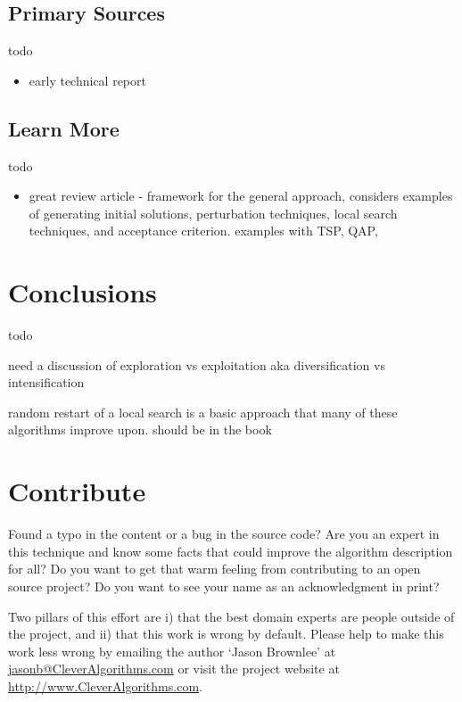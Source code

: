 \documentclass[a4paper, 11pt]{article}
\makeatletter
\newcommand{\myreportauthor}{Jason Brownlee}
\newcommand{\myreportemail}{jasonb@CleverAlgorithms.com}
\newcommand{\myreportwebsite}{http://www.CleverAlgorithms.com}
\makeatother
\begin{document}
\subsection{Primary Sources}
todo

\begin{itemize}
	\item early technical report \cite{Stuetzle1999}
\end{itemize}

% 
% 
\subsection{Learn More}
todo

\begin{itemize}
	\item great review article \cite{Ramalhinho-Lourenco2003} - framework for the general approach, considers examples of generating initial solutions, perturbation techniques, local search techniques, and acceptance criterion. examples with TSP, QAP, 
\end{itemize}

% 
% 
\section{Conclusions}
\label{sec:conclusions}
todo

need a discussion of exploration vs exploitation  aka diversification vs intensification

random restart of a local search is a basic approach that many of these algorithms improve upon. should be in the book 

% 
% 
\section{Contribute}
\label{sec:contribute}
Found a typo in the content or a bug in the source code? 
Are you an expert in this technique and know some facts that could improve the algorithm description for all?
Do you want to get that warm feeling from contributing to an open source project? 
Do you want to see your name as an acknowledgment in print?

Two pillars of this effort are i) that the best domain experts are people outside of the project, and ii) that this work is wrong by default. 
Please help to make this work less wrong by emailing the author `\myreportauthor' at \url{\myreportemail} or visit the project website at \url{\myreportwebsite}.



\end{document}
